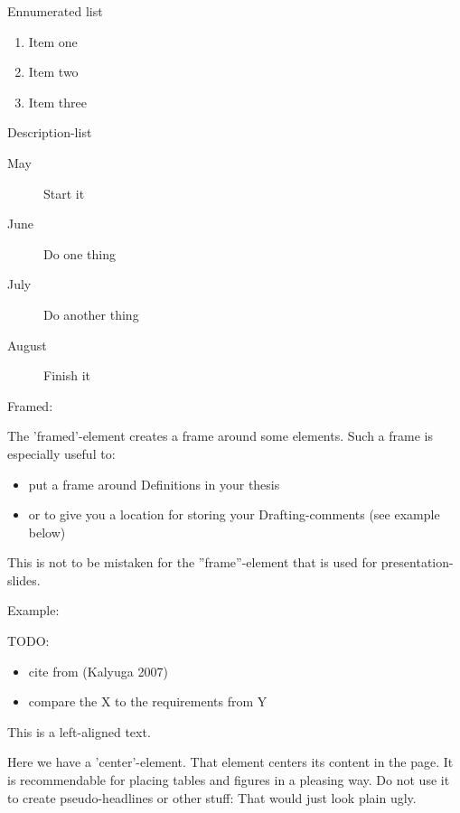 \documentclass[a4paper, 12pt,oneside]{article}
\begin{document}
Ennumerated list
\begin{enumerate}
\item Item one
\item Item two
\item Item three
\end{enumerate}

Description-list %
\begin{description}
\item[May] Start it
\item[June] Do one thing
\item[July] Do another thing
\item[August] Finish it
\end{description}

Framed:\\

\begin{framed}
The 'framed'-element creates a frame around some elements. Such a frame is especially useful to:
\begin{itemize}
\item put a frame around Definitions in your thesis
\item or to give you a location for storing your Drafting-comments (see example below)
\end{itemize}

This is not to be mistaken for the ''frame''-element that is used for presentation-slides. 
\end{framed}

Example:
\begin{framed}
TODO:
\begin{itemize}
\item cite from (Kalyuga 2007)
\item compare the X to the requirements from Y
\end{itemize}
\end{framed}


\begin{flushleft}
This is a left-aligned text. 
\end{flushleft}

\begin{center}
Here we have a 'center'-element. That element centers its content in the page. It is recommendable for placing tables and figures in a pleasing way. Do not use it to create pseudo-headlines or other stuff: That would just look plain ugly. 
\end{center}
\end{document}
